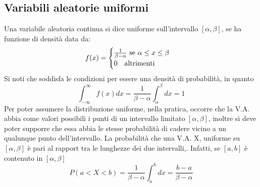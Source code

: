 \documentclass[11pt]{article}
\begin{document}
\subsection{Variabili aleatorie uniformi}
Una variabile aleatoria continua si dice uniforme sull'intervallo $[\alpha,\beta]$, se ha funzione di densità data da:
\begin{displaymath}
    f(x)=
    \begin{cases}
        \frac{1}{\beta-\alpha} \mbox{ se }\alpha\le x \le \beta\\
        0\hspace{10px}\mbox{altrimenti} 
    \end{cases}
\end{displaymath}
Si noti che soddisfa le condizioni per essere una densità di probabilità, in quanto
\begin{displaymath}
    \int_{-\infty}^\infty f(x)dx =\frac{1}{\beta-\alpha}\int_\alpha^\beta dx=1
\end{displaymath}
Per poter assumere la distribuzione uniforme, nella pratica, occorre che la V.A. abbia come valori possibili i punti di un intervallo limitato $[\alpha,\beta]$, inoltre si deve poter supporre che essa abbia le stesse probabilità di cadere vicino a un qualunque punto dell'intervallo.
La probabilità che una V.A. X, uniforme su $[\alpha,\beta]$ è pari al rapport tra le lunghezze dei due intervalli,. Infatti, se $[a,b]$ è contenuto in $[\alpha,\beta]$
\begin{displaymath}
    P(a<X<b)=\frac{1}{\beta-\alpha}\int_a^b dx = \frac{b-a}{\beta-\alpha}
\end{displaymath}
\end{document}
